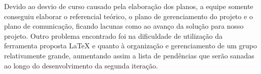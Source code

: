 Devido ao desvio de curso causado pela elaboração dos planos, a equipe somente conseguiu elaborar o referencial teórico, o plano de gerenciamento do projeto e o plano de comunicação, ficando lacunas como ao avanço da solução para nosso projeto. Outro problema encontrado foi na dificuldade de utilização da ferramenta proposta LaTeX e quanto à organização e gerenciamento de um grupo relativamente grande, aumentando assim a lista de pendências que serão sanadas ao longo do desenvolvimento da segunda iteração.
